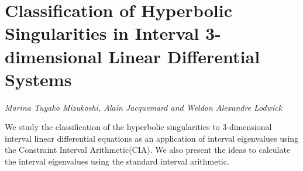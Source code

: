 \documentclass[../booklet.tex]{subfiles}
\begin{document}
\section[Classification of Hyperbolic Singularities in Interval 3-dimensional Linear Differential Systems. {\it Marina Tuyako Mizukoshi, Alain Jacquemard and Weldon Alexandre Lodwick}]{Classification of Hyperbolic Singularities in Interval 3-dimensional Linear Differential Systems}
  

\begin{center}
  {\it Marina Tuyako Mizukoshi, Alain Jacquemard and Weldon Alexandre Lodwick}
\end{center}

\vskip 0.8cm


We study the classification of the hyperbolic singularities to 3-dimensional interval linear differential equations as an application of  interval eigenvalues using the Constraint Interval Arithmetic(CIA). We also present the ideas to calculate the interval eigenvalues using the standard interval arithmetic.

\end{document}
